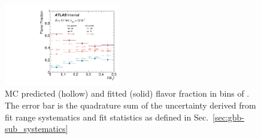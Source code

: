 \begin{figure}[htbp]
  \centering
  \includegraphics[width=0.45\textwidth]{figures/gbb/paperplots/Canv_ZpT_FracDataMC}      
 \caption{MC predicted (hollow) and fitted (solid) flavor fraction in bins of \zpt. The error bar is the quadrature sum of the uncertainty derived from fit range systematics and fit statistics as defined in Sec.~\ref{sec:gbb-sub_systematics}}
  \label{fig:ZpT-fitfrac}
\end{figure}

